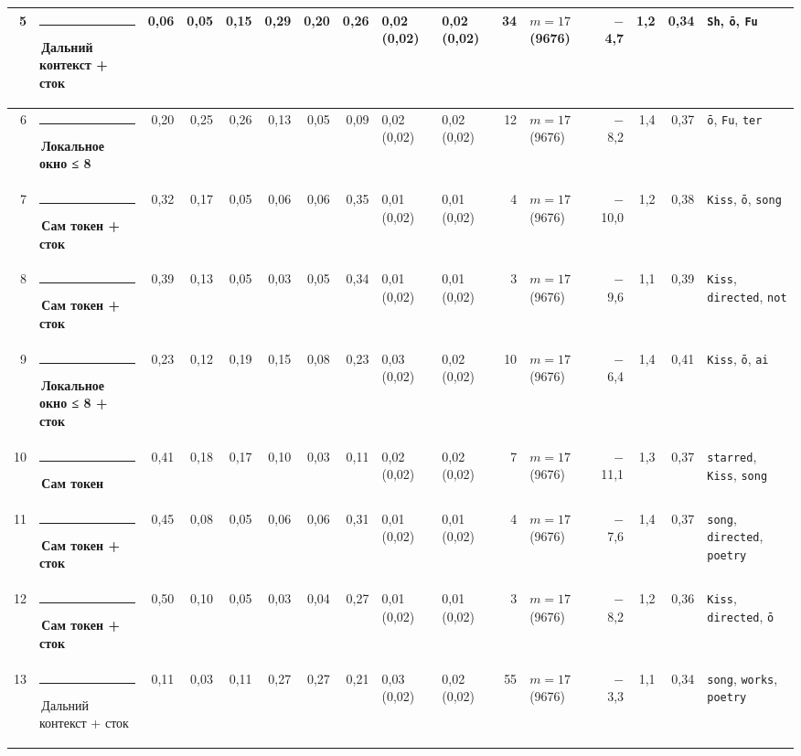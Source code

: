 \documentclass[10pt]{article}
\begin{document}
\begin{minipage}{\linewidth}
\begin{center}
{\begin{tabular}{|r|l|r|r|r|r|r|r|l|l|r|l|r|r|r|l|}
5 & \textcolor[HTML]{C3C2B7}{\rule{0.62em}{0.62em}}\,Дальний контекст + сток & 0,06 & 0,05 & 0,15 & 0,29 & 0,20 & 0,26 & 0,02 (0,02) & 0,02 (0,02) & 34 & $m{=}17$ (9676) & $-$4,7 & 1,2 & 0,34 & \texttt{\textvisiblespace{}Sh}, \texttt{ō}, \texttt{\textvisiblespace{}Fu} \\ \hline
6 & \textcolor[HTML]{1BAF7A}{\rule{0.62em}{0.62em}}\,\textbf{Локальное окно ≤ 8} & 0,20 & 0,25 & 0,26 & 0,13 & 0,05 & 0,09 & 0,02 (0,02) & 0,02 (0,02) & 12 & $m{=}17$ (9676) & $-$8,2 & 1,4 & 0,37 & \texttt{ō}, \texttt{\textvisiblespace{}Fu}, \texttt{ter} \\ \hline
7 & \textcolor[HTML]{2A78D6}{\rule{0.62em}{0.62em}}\,\textbf{Сам токен + сток} & 0,32 & 0,17 & 0,05 & 0,06 & 0,06 & 0,35 & 0,01 (0,02) & 0,01 (0,02) & 4 & $m{=}17$ (9676) & $-$10,0 & 1,2 & 0,38 & \texttt{\textvisiblespace{}Kiss}, \texttt{ō}, \texttt{\textvisiblespace{}song} \\ \hline
8 & \textcolor[HTML]{2A78D6}{\rule{0.62em}{0.62em}}\,\textbf{Сам токен + сток} & 0,39 & 0,13 & 0,05 & 0,03 & 0,05 & 0,34 & 0,01 (0,02) & 0,01 (0,02) & 3 & $m{=}17$ (9676) & $-$9,6 & 1,1 & 0,39 & \texttt{\textvisiblespace{}Kiss}, \texttt{\textvisiblespace{}directed}, \texttt{\textvisiblespace{}not} \\ \hline
9 & \textcolor[HTML]{1BAF7A}{\rule{0.62em}{0.62em}}\,\textbf{Локальное окно ≤ 8 + сток} & 0,23 & 0,12 & 0,19 & 0,15 & 0,08 & 0,23 & 0,03 (0,02) & 0,02 (0,02) & 10 & $m{=}17$ (9676) & $-$6,4 & 1,4 & 0,41 & \texttt{\textvisiblespace{}Kiss}, \texttt{ō}, \texttt{ai} \\ \hline
10 & \textcolor[HTML]{2A78D6}{\rule{0.62em}{0.62em}}\,\textbf{Сам токен} & 0,41 & 0,18 & 0,17 & 0,10 & 0,03 & 0,11 & 0,02 (0,02) & 0,02 (0,02) & 7 & $m{=}17$ (9676) & $-$11,1 & 1,3 & 0,37 & \texttt{\textvisiblespace{}starred}, \texttt{\textvisiblespace{}Kiss}, \texttt{\textvisiblespace{}song} \\ \hline
11 & \textcolor[HTML]{2A78D6}{\rule{0.62em}{0.62em}}\,\textbf{Сам токен + сток} & 0,45 & 0,08 & 0,05 & 0,06 & 0,06 & 0,31 & 0,01 (0,02) & 0,01 (0,02) & 4 & $m{=}17$ (9676) & $-$7,6 & 1,4 & 0,37 & \texttt{\textvisiblespace{}song}, \texttt{\textvisiblespace{}directed}, \texttt{\textvisiblespace{}poetry} \\ \hline
12 & \textcolor[HTML]{2A78D6}{\rule{0.62em}{0.62em}}\,\textbf{Сам токен + сток} & 0,50 & 0,10 & 0,05 & 0,03 & 0,04 & 0,27 & 0,01 (0,02) & 0,01 (0,02) & 3 & $m{=}17$ (9676) & $-$8,2 & 1,2 & 0,36 & \texttt{\textvisiblespace{}Kiss}, \texttt{\textvisiblespace{}directed}, \texttt{ō} \\ \hline
13 & \textcolor[HTML]{C3C2B7}{\rule{0.62em}{0.62em}}\,Дальний контекст + сток & 0,11 & 0,03 & 0,11 & 0,27 & 0,27 & 0,21 & 0,03 (0,02) & 0,02 (0,02) & 55 & $m{=}17$ (9676) & $-$3,3 & 1,1 & 0,34 & \texttt{\textvisiblespace{}song}, \texttt{\textvisiblespace{}works}, \texttt{\textvisiblespace{}poetry} \\ \hline
\hline\end{tabular}}\end{center}
\end{minipage}
\end{document}
